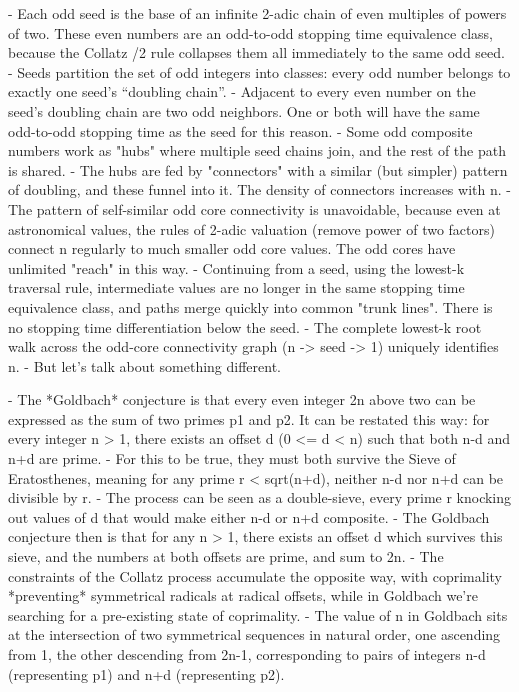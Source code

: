 \documentclass[12pt]{article}
\theoremstyle{plain}
\theoremstyle{definition}
\begin{document}
- Each odd seed is the base of an infinite 2-adic chain of even multiples of powers of two. These even numbers are an odd-to-odd stopping time equivalence class, because the Collatz /2 rule collapses them all immediately to the same odd seed.
- Seeds partition the set of odd integers into classes: every odd number belongs to exactly one seed’s “doubling chain”.
- Adjacent to every even number on the seed's doubling chain are two odd neighbors. One or both will have the same odd-to-odd stopping time as the seed for this reason.
- Some odd composite numbers work as "hubs" where multiple seed chains join, and the rest of the path is shared.
- The hubs are fed by "connectors" with a similar (but simpler) pattern of doubling, and these funnel into it. The density of connectors increases with n.
- The pattern of self-similar odd core connectivity is unavoidable, because even at astronomical values, the rules of 2-adic valuation (remove power of two factors) connect n regularly to much smaller odd core values. The odd cores have unlimited "reach" in this way.
- Continuing from a seed, using the lowest-k traversal rule, intermediate values are no longer in the same stopping time equivalence class, and paths merge quickly into common "trunk lines". There is no stopping time differentiation below the seed.
- The complete lowest-k root walk across the odd-core connectivity graph (n -> seed -> 1) uniquely identifies n.
- But let's talk about something different.



- The *Goldbach* conjecture is that every even integer 2n above two can be expressed as the sum of two primes p1 and p2. It can be restated this way: for every integer n > 1, there exists an offset d (0 <= d < n) such that both n-d and n+d are prime.
- For this to be true, they must both survive the Sieve of Eratosthenes, meaning for any prime r < sqrt(n+d), neither n-d nor n+d can be divisible by r.
- The process can be seen as a double-sieve, every prime r knocking out values of d that would make either n-d or n+d composite.
- The Goldbach conjecture then is that for any n > 1, there exists an offset d which survives this sieve, and the numbers at both offsets are prime, and sum to 2n.
- The constraints of the Collatz process accumulate the opposite way, with coprimality *preventing* symmetrical radicals at radical offsets, while in Goldbach we're searching for a pre-existing state of coprimality.
- The value of n in Goldbach sits at the intersection of two symmetrical sequences in natural order, one ascending from 1, the other descending from 2n-1, corresponding to pairs of integers n-d (representing p1) and n+d (representing p2). 
\end{document}
